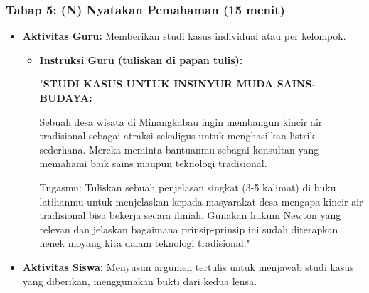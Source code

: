 \documentclass[a4paper,12pt]{article}
\begin{document}
\subsubsection{Tahap 5: (N) Nyatakan Pemahaman (15 menit)}
\begin{itemize}
\item \textbf{Aktivitas Guru:} Memberikan studi kasus individual atau per kelompok.
    \begin{itemize}
    \item \textbf{Instruksi Guru (tuliskan di papan tulis):}
    
    "\textbf{STUDI KASUS UNTUK INSINYUR MUDA SAINS-BUDAYA:}
    
    Sebuah desa wisata di Minangkabau ingin membangun kincir air tradisional sebagai atraksi sekaligus untuk menghasilkan listrik sederhana. Mereka meminta bantuanmu sebagai konsultan yang memahami baik sains maupun teknologi tradisional.
    
    Tugasmu: Tuliskan sebuah penjelasan singkat (3-5 kalimat) di buku latihanmu untuk menjelaskan kepada masyarakat desa mengapa kincir air tradisional bisa bekerja secara ilmiah. Gunakan hukum Newton yang relevan dan jelaskan bagaimana prinsip-prinsip ini sudah diterapkan nenek moyang kita dalam teknologi tradisional."
    \end{itemize}
\item \textbf{Aktivitas Siswa:} Menyusun argumen tertulis untuk menjawab studi kasus yang diberikan, menggunakan bukti dari kedua lensa.
\end{itemize}
\end{document}
